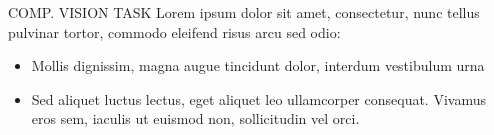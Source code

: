 \documentclass[final]{beamer}
\newlength{\sepwid}
\newlength{\onecolwid}
\begin{document}
\begin{frame}[t]
%


\begin{columns}[t]

\begin{column}{\sepwid}
\end{column} %

\begin{column}{\onecolwid} %


%
%
\begin{alertblock}{COMP. VISION TASK}
%
Lorem ipsum dolor sit amet, consectetur, nunc tellus pulvinar tortor, commodo eleifend risus arcu sed odio:
\begin{itemize}
\item Mollis dignissim, magna augue tincidunt dolor, interdum vestibulum urna
\item Sed aliquet luctus lectus, eget aliquet leo ullamcorper consequat. Vivamus eros sem, iaculis ut euismod non, sollicitudin vel orci.
\end{itemize}


\end{alertblock}
\end{column}
\end{columns}
\end{frame}
\end{document}
